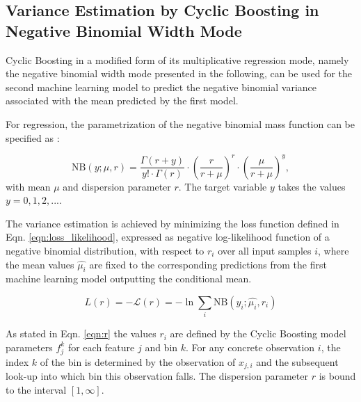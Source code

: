 \documentclass[BCOR=1mm, DIV=calc,10pt,
twoside=true,
twocolumn,
headings=normal]{scrartcl}
\newcommand{\eqn}{Eqn. }
\begin{document}

\subsection{Variance Estimation by Cyclic Boosting in Negative Binomial Width Mode}

Cyclic Boosting in a modified form of its multiplicative regression mode, namely the
negative binomial width mode presented in the following, can be used for the second machine
learning model to predict the negative binomial variance associated with the mean
predicted by the first model. 

For regression, the parametrization of the negative binomial mass function
can be specified as \cite{hilbe2011negative}:

\begin{equation} \label{eqn:nbinom}
\mathrm{NB}(y; \mu, r) = \frac{\Gamma(r + y)}{y! \cdot \Gamma(r)} \cdot \left(\frac{r}{r + \mu}\right)^r \cdot \left(\frac{\mu}{r + \mu}\right)^y,
\end{equation}
with mean $\mu$ and dispersion parameter $r$. The target variable $y$ takes the values $y = 0, 1, 2, ...$.

The variance estimation is achieved by minimizing the loss function defined in \eqn
\eqref{eqn:loss_likelihood}, expressed as negative log-likelihood function of a negative
binomial distribution, with respect to $r_i$ over all input samples $i$, where the mean
values $\hat{\mu_i}$ are fixed to the corresponding predictions from the first machine
learning model outputting the conditional mean.

\begin{equation} \label{eqn:loss_likelihood}
L(r) = -\mathcal{L}(r) = -\ln \sum_i \mathrm{NB}(y_i; \hat{\mu_i}, r_i)
\end{equation}

As stated in \eqn \eqref{eqn:r} the values $r_i$ are defined by the Cyclic Boosting
model parameters $f^k_j$ for each feature $j$ and bin $k$. For any concrete observation
$i$, the index $k$ of the bin is determined by the observation of $x_{j,i}$ and the
subsequent look-up into which bin this observation falls. The dispersion parameter $r$ is
bound to the interval $[1, \infty]$.
\end{document}
